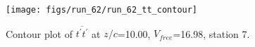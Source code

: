 \begin{figure}[H]
\centering
\texttt{[image: figs/run\_62/run\_62\_tt\_contour]}
\caption{Contour plot of $\overline{t^\prime t^\prime}$ at $z/c$=10.00, $V_{free}$=16.98, station 7.}
\end{figure}


